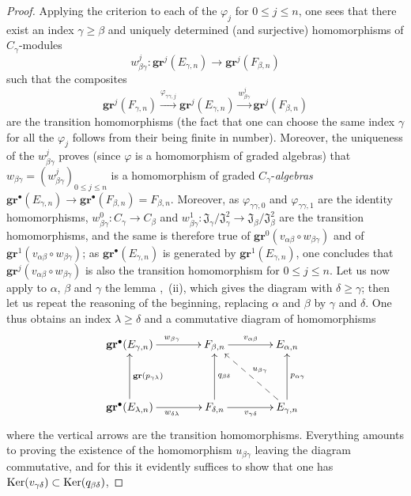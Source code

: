 \begin{proof}
Applying the criterion  to each of the $\varphi_j$ for $0\leq j\leq n$,
one sees that there exist an index $\gamma\geq\beta$ and uniquely determined (and surjective) homomorphisms of $C_\gamma$-modules
\[
  w_{\beta\gamma}^j:\mathbf{gr}^j(E_{\gamma,n})\to\mathbf{gr}^j(F_{\beta,n})
\]
such that the composites
\[
  \mathbf{gr}^j(F_{\gamma,n})\xrightarrow{\varphi_{\gamma\gamma,j}}\mathbf{gr}^j(E_{\gamma,n})\xrightarrow{w_{\beta\gamma}^j}\mathbf{gr}^j(F_{\beta,n})
\]
are the transition homomorphisms (the fact that one can choose the same index $\gamma$ for all the $\varphi_j$ follows from their being finite in number).
Moreover, the uniqueness of the $w_{\beta\gamma}^j$ proves (since $\varphi$ is a homomorphism of graded algebras) that
$w_{\beta\gamma}=(w_{\beta\gamma}^j)_{0\leq j\leq n}$ is a homomorphism of graded $C_\gamma$-\emph{algebras} $\mathbf{gr}^\bullet(E_{\gamma,n})\to\mathbf{gr}^\bullet(F_{\beta,n})=F_{\beta,n}$.
Moreover, as $\varphi_{\gamma\gamma,0}$ and $\varphi_{\gamma\gamma,1}$ are the identity homomorphisms,
$w_{\beta\gamma}^0:C_\gamma\to C_\beta$ and
$w_{\beta\gamma}^1:\mathfrak{J}_\gamma/\mathfrak{J}_\gamma^2
\to\mathfrak{J}_\beta/\mathfrak{J}_\beta^2$ are the transition homomorphisms, and the same is therefore true of
$\mathbf{gr}^0(v_{\alpha\beta}\circ w_{\beta\gamma})$ and of
$\mathbf{gr}^1(v_{\alpha\beta}\circ w_{\beta\gamma})$; as
$\mathbf{gr}^\bullet(E_{\gamma,n})$ is generated by $\mathbf{gr}^1(E_{\gamma,n})$, one concludes that
$\mathbf{gr}^j(v_{\alpha\beta}\circ w_{\beta\gamma})$ is also the transition homomorphism for $0\leq j\leq n$.
Let us now apply to $\alpha$, $\beta$ and $\gamma$ the lemma ,~(ii), which gives the diagram  with $\delta\geq\gamma$; then let us repeat the reasoning of the beginning, replacing $\alpha$ and $\beta$ by $\gamma$ and $\delta$.
One thus obtains an index $\lambda\geq\delta$ and a commutative diagram of homomorphisms
\[
\xymatrix@C=4em@R=4em{
  \mathbf{gr}^\bullet(E_{\gamma,n})\ar[r]^{w_{\beta\gamma}} &
  F_{\beta,n}\ar[r]^{v_{\alpha\beta}} & E_{\alpha,n} \\
  \mathbf{gr}^\bullet(E_{\lambda,n})\ar[u]_{\mathbf{gr}(p_{\gamma\lambda})}
    \ar[r]_{w_{\delta\lambda}} &
  F_{\delta,n}\ar[u]_{q_{\beta\delta}}\ar[r]_{v_{\gamma\delta}} &
  E_{\gamma,n}\ar[u]_{p_{\alpha\gamma}}
    \ar@{-->}[ul]_{u_{\beta\gamma}}
}
\]
where the vertical arrows are the transition homomorphisms.
Everything amounts to proving the existence of the homomorphism $u_{\beta\gamma}$ leaving the diagram commutative, and for this it evidently suffices to show that one has $\operatorname{Ker}(v_{\gamma\delta})\subset\operatorname{Ker}(q_{\beta\delta})$,

\end{proof}
